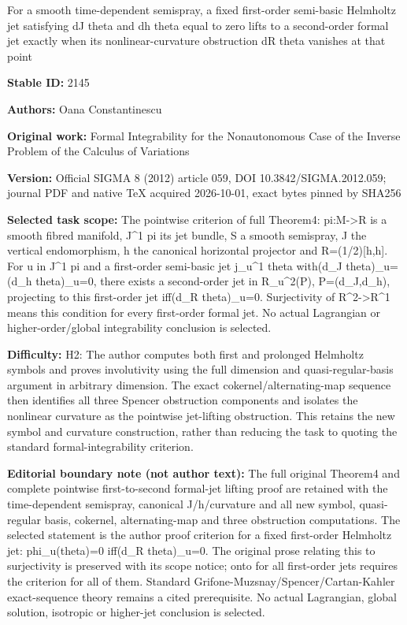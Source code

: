 \documentclass[11pt]{article}
\begin{document}
\begin{center}\Large For a smooth time-dependent semispray, a fixed first-order semi-basic Helmholtz jet satisfying dJ theta and dh theta equal to zero lifts to a second-order formal jet exactly when its nonlinear-curvature obstruction dR theta vanishes at that point\end{center}
\noindent\textbf{Stable ID:} 2145\par
\noindent\textbf{Authors:} Oana Constantinescu\par
\noindent\textbf{Original work:} Formal Integrability for the Nonautonomous Case of the Inverse Problem of the Calculus of Variations\par
\noindent\textbf{Version:} Official SIGMA 8 (2012) article 059, DOI 10.3842/SIGMA.2012.059; journal PDF and native TeX acquired 2026-10-01, exact bytes pinned by SHA256\par
\noindent\textbf{Selected task scope:} The pointwise criterion of full Theorem4: pi:M->R is a smooth fibred manifold, J\textasciicircum{}1 pi its jet bundle, S a smooth semispray, J the vertical endomorphism, h the canonical horizontal projector and R=\allowbreak{}(1/2)[h,h]. For u in J\textasciicircum{}1 pi and a first-order semi-basic jet j\_u\textasciicircum{}1 theta with(d\_J theta)\_u=\allowbreak{}(d\_h theta)\_u=\allowbreak{}0, there exists a second-order jet in R\_u\textasciicircum{}2(P), P=\allowbreak{}(d\_J,d\_h), projecting to this first-order jet iff(d\_R theta)\_u=\allowbreak{}0. Surjectivity of R\textasciicircum{}2->R\textasciicircum{}1 means this condition for every first-order formal jet. No actual Lagrangian or higher-order/global integrability conclusion is selected.\par
\noindent\textbf{Difficulty:} H2: The author computes both first and prolonged Helmholtz symbols and proves involutivity using the full dimension and quasi-regular-basis argument in arbitrary dimension. The exact cokernel/alternating-map sequence then identifies all three Spencer obstruction components and isolates the nonlinear curvature as the pointwise jet-lifting obstruction. This retains the new symbol and curvature construction, rather than reducing the task to quoting the standard formal-integrability criterion.\par
\noindent\textbf{Editorial boundary note (not author text):} The full original Theorem4 and complete pointwise first-to-second formal-jet lifting proof are retained with the time-dependent semispray, canonical J/h/curvature and all new symbol, quasi-regular basis, cokernel, alternating-map and three obstruction computations. The selected statement is the author proof criterion for a fixed first-order Helmholtz jet: phi\_u(theta)=\allowbreak{}0 iff(d\_R theta)\_u=\allowbreak{}0. The original prose relating this to surjectivity is preserved with its scope notice; onto for all first-order jets requires the criterion for all of them. Standard Grifone-Muzsnay/Spencer/Cartan-Kahler exact-sequence theory remains a cited prerequisite. No actual Lagrangian, global solution, isotropic or higher-jet conclusion is selected.\par
\end{document}
